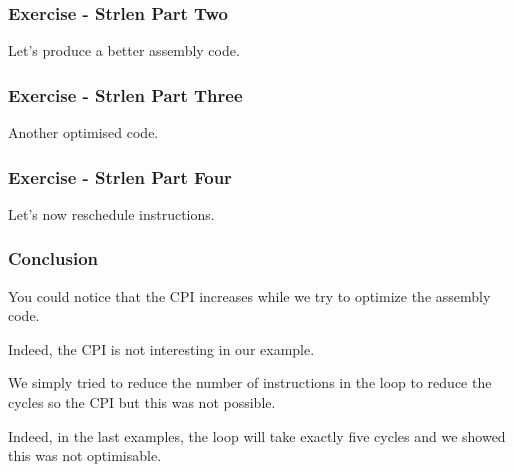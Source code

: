 
\begin{frame}
  \frametitle{Exercise - Strlen Part Two}

  Let's produce a better assembly code.

  \begin{center}
  \end{center}
\end{frame}


\begin{frame}
  \frametitle{Exercise - Strlen Part Three}

  Another optimised code.

  \begin{center}
  \end{center}
\end{frame}


\begin{frame}
  \frametitle{Exercise - Strlen Part Four}

  Let's now reschedule instructions.

  \begin{center}
  \end{center}
\end{frame}


\begin{frame}
  \frametitle{Conclusion}

  You could notice that the CPI increases while we try to
  optimize the assembly code.

  \-

  Indeed, the CPI is not interesting in our example.

  \-

  We simply tried to reduce the number of instructions in the loop
  to reduce the cycles so the CPI but this was not possible.

  \-

  Indeed, in the last examples, the loop will take exactly five cycles
  and we showed this was not optimisable.
\end{frame}


